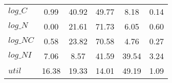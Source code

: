 \begin{center}
\begin{longtable}{lccccc}
$log\_C          $	 & 	        0.99	 & 	       40.92	 & 	       49.77	 & 	        8.18	 & 	        0.14 \\ 
$log\_N          $	 & 	        0.00	 & 	       21.61	 & 	       71.73	 & 	        6.05	 & 	        0.60 \\ 
$log\_NC         $	 & 	        0.58	 & 	       23.82	 & 	       70.58	 & 	        4.76	 & 	        0.27 \\ 
$log\_NI         $	 & 	        7.06	 & 	        8.57	 & 	       41.59	 & 	       39.54	 & 	        3.24 \\ 
${util}          $	 & 	       16.38	 & 	       19.33	 & 	       14.01	 & 	       49.19	 & 	        1.09 \\ 
\end{longtable}
 \end{center}
